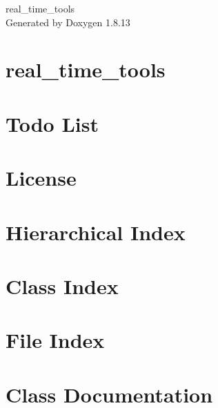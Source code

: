 \documentclass[twoside]{book}
\newcommand{\+}{\discretionary{\mbox{\scriptsize$\hookleftarrow$}}{}{}}
\newcommand{\clearemptydoublepage}{%
  \newpage{\pagestyle{empty}\cleardoublepage}%
}
\begin{document}
\hypersetup{pageanchor=false,
             bookmarksnumbered=true,
             pdfencoding=unicode
            }
\begin{titlepage}
\vspace*{7cm}
\begin{center}%
{\Large real\+\_\+time\+\_\+tools }\\
\vspace*{1cm}
{\large Generated by Doxygen 1.8.13}\\
\end{center}
\end{titlepage}
\clearemptydoublepage
{}
\tableofcontents
\clearemptydoublepage
{}
\hypersetup{pageanchor=true}

\chapter{real\+\_\+time\+\_\+tools}
\label{index}\hypertarget{index}{}
\chapter{Todo List}
\label{todo}

\chapter{License}
\label{license}

\chapter{Hierarchical Index}

\chapter{Class Index}

\chapter{File Index}

\chapter{Class Documentation}

















\end{document}
